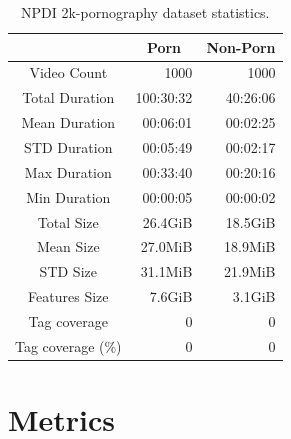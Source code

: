 \begin{table}
\centering
\caption{NPDI 2k-pornography dataset statistics.}
\begin{tabular}{c|r|r} 
\multicolumn{1}{l|}{} & \multicolumn{1}{c|}{Porn} & \multicolumn{1}{c}{Non-Porn}  \\ 
\hline
Video Count           & 1000                      & 1000                           \\ 
\hline
Total Duration        & 100:30:32                 & 40:26:06                       \\ 
\hline
Mean Duration         & 00:06:01                  & 00:02:25                       \\ 
\hline
STD Duration          & 00:05:49                  & 00:02:17                       \\ 
\hline
Max Duration          & 00:33:40                  & 00:20:16                       \\ 
\hline
Min Duration          & 00:00:05                  & 00:00:02                       \\ 
\hline
Total Size            & 26.4GiB                   & 18.5GiB                        \\ 
\hline
Mean Size             & 27.0MiB                   & 18.9MiB                        \\ 
\hline
STD Size              & 31.1MiB                   & 21.9MiB                        \\ 
\hline
Features Size         & 7.6GiB                    & 3.1GiB                         \\ 
\hline
Tag coverage          & 0                      & 0                           \\ 
\hline
Tag coverage (\%)     & 0                       & 0                            \\
\end{tabular}
\label{tab:2kdataset-stats}
\end{table}

\section{Metrics}\label{sec:metrics}


